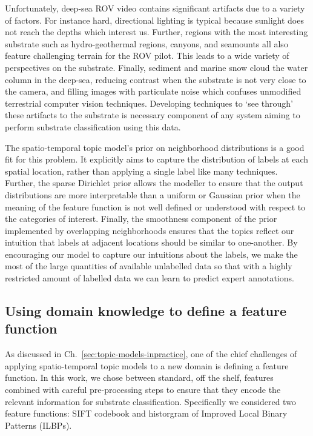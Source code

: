 Unfortunately, deep-sea ROV video contains significant artifacts due to a variety of factors. For instance hard, directional lighting is typical because sunlight does not reach the depths which interest us. Further, regions with the most interesting substrate such as hydro-geothermal regions, canyons, and seamounts all also feature challenging terrain for the ROV pilot. This leads to a wide variety of perspectives on the substrate. Finally, sediment and marine snow cloud the water column in the deep-sea, reducing contrast when the substrate is not very close to the camera, and filling images with particulate noise which confuses unmodified terrestrial computer vision techniques. Developing techniques to `see through' these artifacts to the substrate is necessary component of any system aiming to perform substrate classification using this data.

The spatio-temporal topic model's prior on neighborhood distributions is a good fit for this problem. It explicitly aims to capture the distribution of labels at each spatial location, rather than applying a single label like many techniques. Further, the sparse Dirichlet prior allows the modeller to ensure that the output distributions are more interpretable than a uniform or Gaussian prior when the meaning of the feature function is not well defined or understood with respect to the categories of interest. Finally, the smoothness component of the prior implemented by overlapping neighborhoods ensures that the topics reflect our intuition that labels at adjacent locations should be similar to one-another. By encouraging our model to capture our intuitions about the labels, we make the most of the large quantities of available unlabelled data so that with a highly restricted amount of labelled data we can learn to predict expert annotations.

\subsection{Using domain knowledge to define a feature function}

As discussed in Ch.~\ref{sec:topic-models-inpractice}, one of the chief challenges of applying spatio-temporal topic models to a new domain is defining a feature function. In this work, we chose between standard, off the shelf, features combined with careful pre-processing steps to ensure that they encode the relevant information for substrate classification. Specifically we considered two feature functions: SIFT codebook and historgram of Improved Local Binary Patterns (ILBPs).

